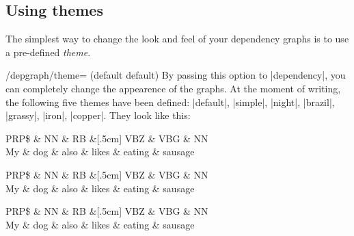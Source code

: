 \documentclass[a4paper]{ltxdoc}
\begin{document}
\subsection{Using themes}

The simplest way to change the look and feel of your dependency graphs is to use a pre-defined \emph{theme}. 

\begin{key}{/depgraph/theme= (default default)}
   By passing this option to |dependency|, you can completely change the appearence of the graphs. At the moment of writing, the following five themes have been defined: |default|, |simple|, |night|, |brazil|, |grassy|, |iron|, |copper|. They look like this:

\begin{codeexample}[]
\begin{dependency}[theme=default]
   \begin{deptext}[column sep=.5cm, row sep=.1ex]
      PRP\$ \& NN \& RB \&[.5cm] VBZ \& VBG \& NN \\
      My \& dog \& also \& likes \& eating \& sausage \\
   \end{deptext}
\end{dependency}
\end{codeexample}

\begin{codeexample}[]
\begin{dependency}[theme=simple]
   \begin{deptext}[column sep=.5cm, row sep=.1ex]
      PRP\$ \& NN \& RB \&[.5cm] VBZ \& VBG \& NN \\
      My \& dog \& also \& likes \& eating \& sausage \\
   \end{deptext}
\end{dependency}
\end{codeexample}

\begin{codeexample}[]
\begin{dependency}[theme=night]
   \begin{deptext}[column sep=.5cm, row sep=.1ex]
      PRP\$ \& NN \& RB \&[.5cm] VBZ \& VBG \& NN \\
      My \& dog \& also \& likes \& eating \& sausage \\
   \end{deptext}
\end{dependency}
\end{codeexample}


\end{key}
\end{document}
